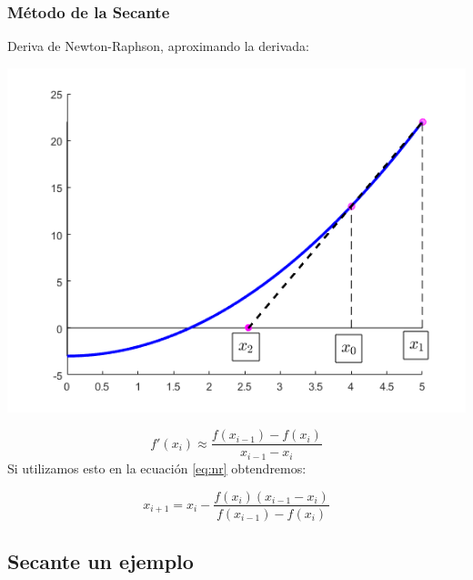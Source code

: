 \documentclass[xcolor=svgnames]{beamer} %
\theoremstyle{plain}
\theoremstyle{definition}
\begin{document}
\begin{frame}
\frametitle{Método de la Secante}
Deriva de Newton-Raphson, aproximando la derivada:

\begin{minipage}{.55\linewidth}
\includegraphics[width=\linewidth]{sec_example/draw.PNG} 
\end{minipage} \begin{minipage}{.4\linewidth}
$$f'(x_{i}) \approx \frac{f(x_{i-1})-f(x_i)}{x_{i-1}-x_i}$$ 
Si utilizamos esto en la ecuación \ref{eq:nr} obtendremos:

$$\boxed{x_{i+1} =x_i - \frac{f(x_i)(x_{i-1}-x_i)}{f(x_{i-1})-f(x_i)} }$$
\end{minipage}
\end{frame}

\subsection{Secante un ejemplo}
\end{document}
